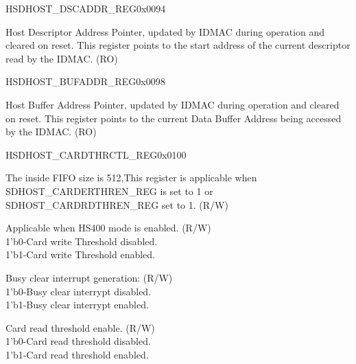 \begin{register}{H}{SDHOST\_DSCADDR\_REG}{0x{}0094}\label{regdesc:DSCADDRREG}
%
\regnewline%
\begin{regdesc}\begin{reglist}
\item [SDHOST\_DSCADDR\_REG]Host Descriptor Address Pointer, updated by IDMAC during operation and cleared on reset. This register points to the start address of the current descriptor read by the IDMAC. (RO)
\end{reglist}\end{regdesc}
\end{register}


\begin{register}{H}{SDHOST\_BUFADDR\_REG}{0x{}0098}\label{regdesc:BUFADDRREG}
%
\regnewline%
\begin{regdesc}\begin{reglist}
\item [SDHOST\_BUFADDR\_REG]Host Buffer Address Pointer, updated by IDMAC during operation and cleared on reset. This register points to the current Data Buffer Address being accessed by the IDMAC. (RO)
\end{reglist}\end{regdesc}
\end{register}


\begin{register}{H}{SDHOST\_CARDTHRCTL\_REG}{0x{}0100}\label{regdesc:CARDTHRCTLREG}
%
%
%
%
%
\regnewline%
\begin{regdesc}\begin{reglist}
\item [SDHOST\_CARDTHRESHOLD\_REG] The inside FIFO size is 512,This register is applicable when SDHOST\_CARDERTHREN\_REG is set to 1 or SDHOST\_CARDRDTHREN\_REG set to 1. (R/W)\\
\item [SDHOST\_CARDWRTHREN\_REG]Applicable when HS400 mode is enabled. (R/W)\\
1'b0-Card write Threshold disabled.\\
1'b1-Card write Threshold enabled.\\
\item [SDHOST\_CARDCLRINTEN\_REG]Busy clear interrupt generation: (R/W)\\
1'b0-Busy clear interrypt disabled.\\
1'b1-Busy clear interrypt enabled.\\
\item [SDHOST\_CARDRDTHREN\_REG] Card read threshold enable. (R/W)\\
1'b0-Card read threshold disabled.\\
1'b1-Card read threshold enabled.\\
\end{reglist}\end{regdesc}
\end{register}

